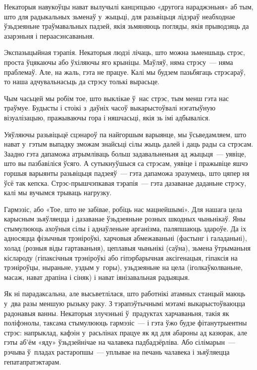 Некаторыя навукоўцы нават вылучылі канцэпцыю «другога нараджэньня» аб тым, што для радыкальных зьменаў у~жыцьці, для разьвіцьця лідэраў неабходнае ўзьдзеяньне траўмавальных падзей, якія зьмяняюць погляды, якія прыводзяць да азарэньня і пераасэнсаваньня.

Экспазыцыйная тэрапія. Некаторыя людзі лічаць, што можна зьменшыць стрэс, проста ўцякаючы або ўхіляючы яго крыніцы. Маўляў, няма стрэсу~--- няма праблемаў. Але, на жаль, гэта не працуе. Калі мы будзем пазьбягаць стрэсараў, то наша адчувальнасьць да стрэсу толькі вырасьце. 

Чым часьцей мы робім тое, што выклікае ў~нас стрэс, тым менш гэта нас траўмуе. Будысты і стоікі з~даўніх часоў выкарыстоўвалі нэгатыўную візуалізацыю, пражываючы гора і няшчасьці, якія зь імі адбываліся.

Уяўляючы разьвіцьцё сцэнароў па найгоршым варыянце, мы ўсьведамляем, што нават у~гэтым выпадку зможам знайсьці сілы жыць далей і даць рады са стрэсам. Заадно гэта дапаможа атрымліваць больш задавальненьня ад жыцьця~--- уявіце, што вы пазбавіліся ўсяго. А сутыкнуўшыся са стрэсам, уявіце і пражывіце яшчэ горшыя варыянты разьвіцьця падзеяў~--- гэта дапаможа зразумець, што цяпер ня ўсё так кепска. Стрэс-прышчэпкавая тэрапія~--- гэта дазаванае даданьне стрэсу, калі мы вучымся трываць нагрузку.

Гармэзіс, або «Тое, што не забівае, робіць нас мацнейшымі». Для нашага цела карысным зьяўляецца і дазаванае ўзьдзеяньне розных шкодных чыньнікаў. Яны стымулююць ахоўныя сілы і аднаўленьне арганізма, паляпшаюць здароўе. Да іх адносяцца фізычныя трэніроўкі, харчовыя абмежаваньні (фастынг і галаданьні), холад (розныя віды гартаваньня), цеплавыя чыньнікі (саўна), зьмена ўтрыманьня кіслароду (гіпаксічныя трэніроўкі або гіпэрбарычная аксігенацыя, гіпаксія на трэніроўцы, ныраньне, уздым у~горы), узьдзеяньне на цела (іголкаўколваньне, масаж, нават драпіна і сіняк) і нават іянізавальная радыяцыя.

Як ні парадаксальна, але высьветлілася, што работнікі атамных станцый маюць у~два разы меншую рызыку раку. З тэрапэўтычнымі мэтамі выкарыстоўваюцца радонавыя ванны. Некаторыя злучэньні ў~прадуктах харчаваньня, такія як поліфэнолы, таксама стымулююць гармэзіс~--- і гэта ўжо будзе фітанутрыентны стрэс: напрыклад, кафэін у~расьлінах працуе як яд для абароны ад казюрак, але гэты аб'ём «яду» ўзьдзейнічае на чалавека падбадзёрліва. Або сілімарын~--- рэчыва ў~пладах растаропшы~--- уплывае на печань чалавека і зьяўляецца гепатапратэктарам.

